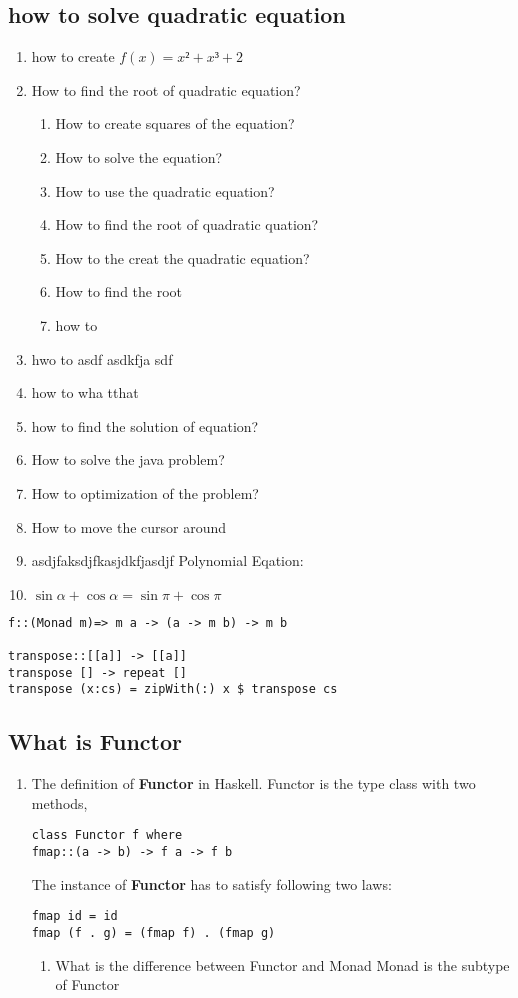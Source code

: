 \documentclass[11pt]{article}
\begin{document}
\subsection{how to solve quadratic equation}
\label{sec:orgcb779aa}
\begin{enumerate}
\item how to create \(f(x) = x² + x³ + 2\)
\item How to find the root of quadratic equation?
\begin{enumerate}
\item How to create squares of the equation?
\item How to solve the equation?
\item How to use the quadratic equation?
\item How to find the root of quadratic quation?
\item How to the creat the quadratic equation?
\item How to find the root
\item how to
\end{enumerate}
\item hwo to asdf asdkfja sdf
\item how to wha tthat
\item how to find the solution of equation?
\item How to solve the java problem?
\item How to optimization of the problem?
\item How to move the cursor around
\item asdjfaksdjfkasjdkfjasdjf
Polynomial Eqation:
\item \(\sin α + \cos α = \sin π + \cos π\)
\end{enumerate}
\begin{verbatim}
f::(Monad m)=> m a -> (a -> m b) -> m b

transpose::[[a]] -> [[a]]
transpose [] -> repeat []
transpose (x:cs) = zipWith(:) x $ transpose cs
\end{verbatim}

\subsection{What is Functor}
\label{sec:orgf2ca174}
\begin{enumerate}
\item The definition of \textbf{Functor} in Haskell.
Functor is the type class with two methods,
\begin{verbatim}
class Functor f where
fmap::(a -> b) -> f a -> f b
\end{verbatim}
The instance of \textbf{Functor} has to satisfy following two laws:
\begin{verbatim}
fmap id = id
fmap (f . g) = (fmap f) . (fmap g)
\end{verbatim}
\begin{enumerate}
\item What is the difference between Functor and Monad
Monad is the subtype of Functor
\end{enumerate}
\end{enumerate}
\end{document}
